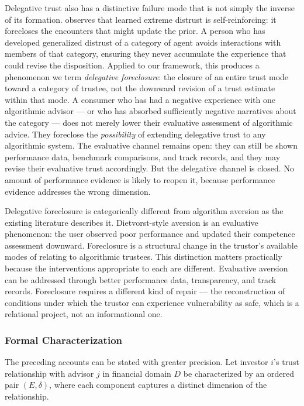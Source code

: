 Delegative trust also has a distinctive failure mode that is not simply the inverse of its formation. \citet{hardin1993street} observes that learned extreme distrust is self-reinforcing: it forecloses the encounters that might update the prior. A person who has developed generalized distrust of a category of agent avoids interactions with members of that category, ensuring they never accumulate the experience that could revise the disposition. Applied to our framework, this produces a phenomenon we term \textit{delegative foreclosure}: the closure of an entire trust mode toward a category of trustee, not the downward revision of a trust estimate within that mode. A consumer who has had a negative experience with one algorithmic advisor --- or who has absorbed sufficiently negative narratives about the category --- does not merely lower their evaluative assessment of algorithmic advice. They foreclose the \textit{possibility} of extending delegative trust to any algorithmic system. The evaluative channel remains open: they can still be shown performance data, benchmark comparisons, and track records, and they may revise their evaluative trust accordingly. But the delegative channel is closed. No amount of performance evidence is likely to reopen it, because performance evidence addresses the wrong dimension.

Delegative foreclosure is categorically different from algorithm aversion as the existing literature describes it. Dietvorst-style aversion is an evaluative phenomenon: the user observed poor performance and updated their competence assessment downward. Foreclosure is a structural change in the trustor's available modes of relating to algorithmic trustees. This distinction matters practically because the interventions appropriate to each are different. Evaluative aversion can be addressed through better performance data, transparency, and track records. Foreclosure requires a different kind of repair --- the reconstruction of conditions under which the trustor can experience vulnerability as safe, which is a relational project, not an informational one.

\subsubsection{Formal Characterization}
\label{subsubsec:formal}

The preceding accounts can be stated with greater precision. Let investor $i$'s trust relationship with advisor $j$ in financial domain $D$ be characterized by an ordered pair $(E, \delta)$, where each component captures a distinct dimension of the relationship.

